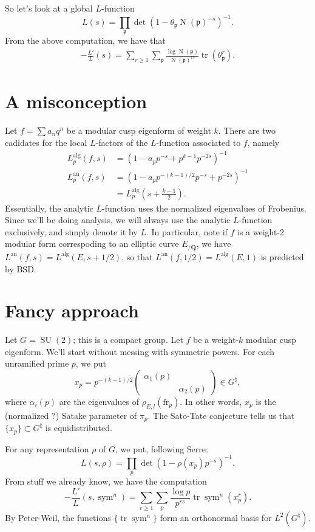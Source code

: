 \documentclass{article}
\DeclareMathOperator{\norm}{N}
\DeclareMathOperator{\SU}{SU}
\DeclareMathOperator{\sym}{sym}
\DeclareMathOperator{\trace}{tr}
\newcommand{\fp}{\mathfrak{p}}
\newcommand{\bQ}{\mathbf{Q}}
\newcommand{\an}{\mathrm{an}}
\newcommand{\alg}{\mathrm{alg}}
\newcommand{\frob}{\mathrm{fr}}
\begin{document}
So let's look at a global $L$-function
\[
	L(s) = \prod_\fp \det(1-\theta_\fp \norm(\fp)^{-s})^{-1} .
\]
From the above computation, we have that 
\begin{align*}
	-\frac{L'}{L}(s) = \sum_{r\geqslant 1} \sum_\fp \frac{\log \norm(\fp)}{\norm(\fp)^{r s}} \trace(\theta_\fp^r) .
\end{align*}





\section{A misconception}

Let $f = \sum a_n q^n$ be a modular cusp eigenform of weight $k$. There are two 
cadidates for the local $L$-factors of the $L$-function associated to $f$, 
namely 
\begin{align*}
	L_p^\alg(f,s) &= (1-a_p p^{-s} + p^{k-1} p^{-2s})^{-1} \\
	L_p^\an(f,s) &= (1-a_p p^{-(k-1)/2} p^{-s} + p^{-2s})^{-1} \\
		&= L_p^\alg\left(s+\frac{k-1}{2}\right) .
\end{align*}
Essentially, the analytic $L$-function uses the normalized eigenvalues of 
Frobenius. Since we'll be doing analysis, we will always use the analytic 
$L$-function exclusively, and simply denote it by $L$. In particular, note if 
$f$ is a weight-$2$ modular form correspoding to an elliptic curve $E_{/\bQ}$, 
we have $L^\an(f,s) = L^\alg(E,s+1/2)$, so that $L^\an(f,1/2) = L^\alg(E,1)$ is 
predicted by BSD. 





\section{Fancy approach}

Let $G=\SU(2)$; this is a compact group. Let $f$ be a weight-$k$ modular cusp 
eigenform. We'll start without messing with symmetric powers. For each 
unramified prime $p$, we put 
\[
	x_p = p^{-(k-1)/2}\begin{pmatrix} \alpha_1(p) \\ & \alpha_2(p)\end{pmatrix} \in G^\natural,
\]
where $\alpha_i(p)$ are the eigenvalues of $\rho_{E,l}(\frob_p)$. In other 
words, $x_p$ is the (normalized ?) Satake parameter of $\pi_p$. The Sato-Tate 
conjecture tells us that $\{x_p\}\subset G^\natural$ is equidistributed. 

For any representation $\rho$ of $G$, we put, following Serre:
\[
	L(s,\rho) = \prod_p \det(1-\rho(x_p)p^{-s})^{-1} .
\]
From stuff we already know, we have the computation 
\[
	-\frac{L'}{L}(s,\sym^n) = \sum_{r\geqslant 1} \sum_p \frac{\log p}{p^{r s}} \trace \sym^n(x_p^r) .
\]
By Peter-Weil, the functions $\{\trace\sym^n\}$ form an orthonormal basis for 
$L^2(G^\natural)$. 
\end{document}

